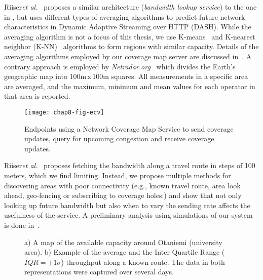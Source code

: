 Riiser\emph{et al.}~\cite{6012045} proposes a similar architecture (\emph{bandwidth lookup
service}) to the one in , but uses different types of
averaging algorithms to predict future network characteristics in Dynamic
Adaptive Streaming over HTTP (DASH). While the averaging algorithm is not a
focus of this thesis, we use K-means~\cite{Kanungo:2002:LSA:513400.513402} and
K-nearest neighbor (K-NN)~\cite{Iwerks:2003:CKN:1315451.1315496} algorithms to
form regions with similar capacity. Details of the averaging algorithms
employed by our coverage map server are discussed in~\cite{sharmistha-thesis}.
A contrary approach is employed by \emph{Netradar.org}~\cite{6576402} which
divides the Earth's geographic map into 100m\,x\,100m squares. All measurements in a
specific area are averaged, and the maximum, minimum and mean values for 
each operator in that area is reported. 

\begin{figure}
\texttt{[image: chap8-fig-ecv]}
  \caption{Endpoints using a Network Coverage Map Service to send coverage
  updates, query for upcoming congestion and receive coverage updates.}
\label{fig:cc:ecv}
\end{figure}

Riiser\emph{et al.}~\cite{Riiser:2012:2240136} proposes fetching the bandwidth along a travel
route in steps of 100 meters, which we find limiting. Instead, we propose
multiple methods for discovering areas with poor connectivity (e.g., known
travel route, area look ahead, geo-fencing or subscribing to coverage holes.)
and show that not only looking up future bandwidth but also when to vary the
sending rate affects the usefulness of the service. A preliminary analysis
using simulations of our system is done in~\cite{Curcio:glass}.

\begin{figure}
  \centerline{
  }
  \centerline{
  }
  \caption{a) A map of the available capacity around Otaniemi (university
  area). b) Example of the average and the Inter Quartile Range
  ($IQR=\pm1\sigma$) throughput along a known route. The data in both
  representations were captured over several days.}
  \label{fig:glass:map}
\end{figure}

